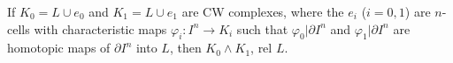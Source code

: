 If $K_0 = L \cup e_0$ and $K_1 = L \cup e_1$ are CW complexes, where the $e_i$ ($i = 0, 1$) are $n$-cells with characteristic maps $\varphi_i: I^n \rightarrow K_i$ such that $\varphi_0 | \partial I^n$ and $\varphi_1 | \partial I^n$ are homotopic maps of $\partial I^n$ into $L$, then $K_0 \wedge K_1$, rel $L$.
